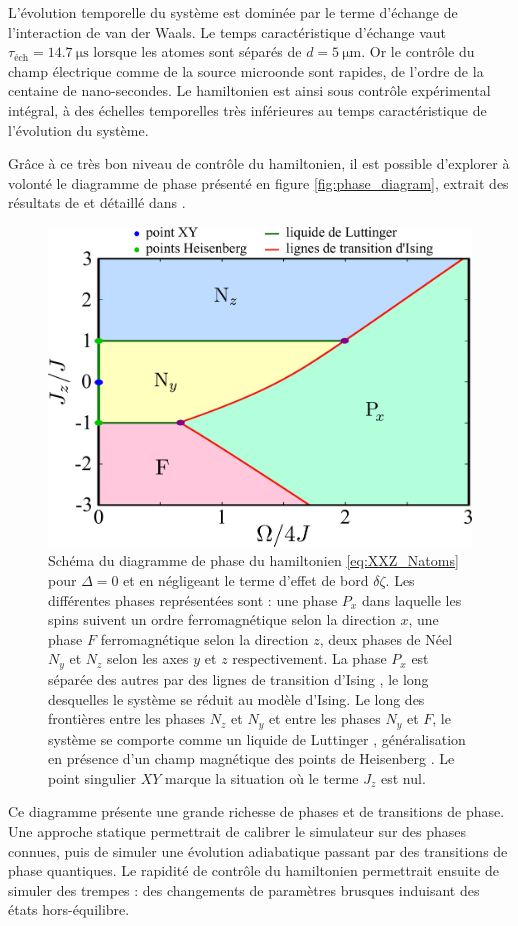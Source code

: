 L'évolution temporelle du système est dominée par le terme d'échange de l'interaction de van der Waals.
Le temps caractéristique d'échange vaut $\tau_{\text{\'ech}} = \SI{14.7}{\us}$ lorsque les atomes sont séparés de $d=\SI{5}{\um}$.
Or le contrôle du champ électrique comme de la source microonde sont rapides, de l'ordre de la centaine de nano-secondes.
Le hamiltonien est ainsi sous contrôle expérimental intégral, à des échelles temporelles très inférieures au temps caractéristique de l'évolution du système.

Grâce à ce très bon niveau de contrôle du hamiltonien, il est possible d'explorer à volonté le diagramme de phase présenté en figure \eqref{fig:phase_diagram}, extrait des résultats de \cite{MX_DMITRIEV02} et détaillé dans \cite{ENS_PRE_CIRCSIM}.
%
\begin{figure}[!h]
\centering
\includegraphics[width=0.7\linewidth]{figures/circsim/phase_diagram}
\caption[Diagramme de phase XXZ]{
Schéma du diagramme de phase du hamiltonien \eqref{eq:XXZ_Natoms} pour $\Delta=0$ et en négligeant le terme d'effet de bord $\delta\zeta$.
Les différentes phases représentées sont : une phase $P_x$ dans laquelle les spins suivent un ordre ferromagnétique selon la direction $x$, une phase $F$ ferromagnétique selon la direction $z$, deux phases de Néel $N_y$ et $N_z$ selon les axes $y$ et $z$ respectivement.
La phase $P_x$ est séparée des autres par des lignes \og de transition d'Ising \fg{}, le long desquelles le système se réduit au modèle d'Ising.
Le long des frontières entre les phases $N_z$ et $N_y$ et entre les phases $N_y$ et $F$, le système se comporte comme un \og liquide de Luttinger \fg{}, généralisation en présence d'un champ magnétique des \og points de Heisenberg \fg{}.
Le point singulier $XY$ marque la situation où le terme $J_z$ est nul.
}
\label{fig:phase_diagram}
\end{figure}
%
Ce diagramme présente une grande richesse de phases et de transitions de phase.
Une approche statique permettrait de calibrer le simulateur sur des phases connues, puis de simuler une évolution adiabatique passant par des transitions de phase quantiques.
Le rapidité de contrôle du hamiltonien permettrait ensuite de simuler des trempes : des changements de paramètres brusques induisant des états hors-équilibre.

